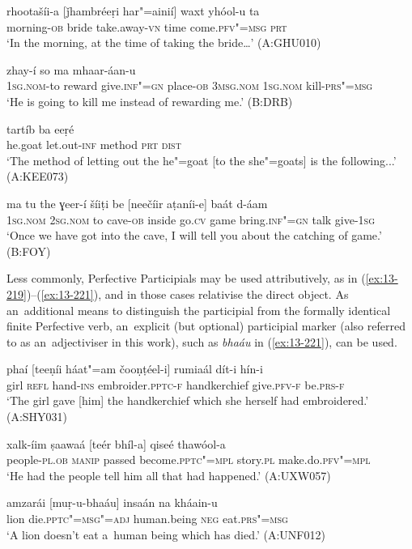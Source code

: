 \begin{exe}
\ex
\label{ex:13-215}
\gll rhootašíi-a [ǰhambréeṛi har"=ainií] waxt  yhóol-u ta \\
morning-\textsc{ob} bride take.away-\textsc{vn} time come.\textsc{pfv"=msg} \textsc{prt} \\
\glt `In the morning, at the time of taking the bride{\ldots}' (A:GHU010)

\ex
\label{ex:13-216}
 zhay-í so  ma mhaar-áan-u \\
\textsc{1sg.nom}-to reward give.\textsc{inf"=gn} place-\textsc{ob} \textsc{3msg.nom} \textsc{1sg.nom} kill-\textsc{prs"=msg} \\
\glt `He is going to kill me instead of rewarding me.' (B:DRB)

\ex
\label{ex:13-217}
 tartíb ba eeṛé  \\
he.goat let.out-\textsc{inf} method \textsc{prt} \textsc{dist} \\
\glt `The method of letting out the he"=goat [to the she"=goats] is the following...' (A:KEE073)

\ex
\label{ex:13-218}
\gll ma tu the ɣeer-í šíiṭi be [neečíir  aṭaníi-e] baát d-áam \\
\textsc{1sg.nom} \textsc{2sg.nom} to cave-\textsc{ob} inside go.\textsc{cv} game  bring.\textsc{inf"=gn} talk give-\textsc{1sg} \\
\glt `Once we have got into the cave, I will tell you about the catching of game.' (B:FOY) 
\end{exe}

Less commonly, Perfective Participials may be used attributively, as in (\ref{ex:13-219})--(\ref{ex:13-221}), and in those cases relativise the direct object. As an~additional means to distinguish the participial from the formally identical finite Perfective verb, an~explicit (but optional) participial marker (also referred to as an~adjectiviser in this work), such as \textit{bhaáu} in (\ref{ex:13-221}), can be used.

\begin{exe}
\ex
\label{ex:13-219}
\gll phaí [teeṇíi háat"=am čooṇṭéel-i] rumiaál dít-i  hín-i \\
girl \textsc{refl} hand-\textsc{ins} embroider.\textsc{pptc-f} handkerchief give.\textsc{pfv-f} be.\textsc{prs-f} \\
\glt `The girl gave [him] the handkerchief which she herself had embroidered.' (A:SHY031)

\ex
\label{ex:13-220}
\gll xalk-íim ṣaawaá [teér bhíl-a] qiseé  thawóol-a \\
people-\textsc{pl.ob} \textsc{manip} passed become.\textsc{pptc"=mpl} story.\textsc{pl} make.do.\textsc{pfv"=mpl} \\
\glt `He had the people tell him all that had happened.' (A:UXW057)

\ex
\label{ex:13-221}
\gll amzarái [muṛ-u-bhaáu] insaán na  kháain-u \\
lion die.\textsc{pptc"=msg"=adj} human.being \textsc{neg} eat.\textsc{prs"=msg} \\
\glt `A lion doesn't eat a~human being which has died.' (A:UNF012) 
\end{exe}

